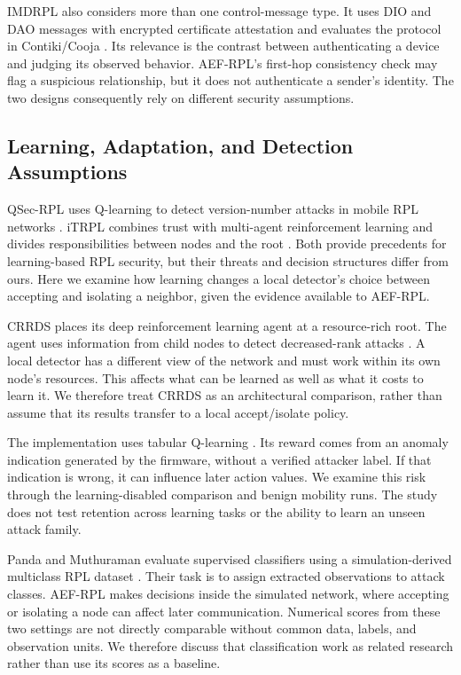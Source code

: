 \documentclass[journal]{IEEEtran}
\begin{document}
IMDRPL also considers more than one control-message type. It uses DIO and DAO messages with encrypted certificate attestation and evaluates the protocol in Contiki/Cooja \cite{imdrpl2023}. Its relevance is the contrast between authenticating a device and judging its observed behavior. AEF-RPL's first-hop consistency check may flag a suspicious relationship, but it does not authenticate a sender's identity. The two designs consequently rely on different security assumptions.

\subsection{Learning, Adaptation, and Detection Assumptions}
QSec-RPL uses Q-learning to detect version-number attacks in mobile RPL networks \cite{qsecrpl2023}. iTRPL combines trust with multi-agent reinforcement learning and divides responsibilities between nodes and the root \cite{itrpl2024}. Both provide precedents for learning-based RPL security, but their threats and decision structures differ from ours. Here we examine how learning changes a local detector's choice between accepting and isolating a neighbor, given the evidence available to AEF-RPL.

CRRDS places its deep reinforcement learning agent at a resource-rich root. The agent uses information from child nodes to detect decreased-rank attacks \cite{haqdad2026}. A local detector has a different view of the network and must work within its own node's resources. This affects what can be learned as well as what it costs to learn it. We therefore treat CRRDS as an architectural comparison, rather than assume that its results transfer to a local accept/isolate policy.

The implementation uses tabular Q-learning \cite{watkins1992}. Its reward comes from an anomaly indication generated by the firmware, without a verified attacker label. If that indication is wrong, it can influence later action values. We examine this risk through the learning-disabled comparison and benign mobility runs. The study does not test retention across learning tasks or the ability to learn an unseen attack family.

Panda and Muthuraman evaluate supervised classifiers using a simulation-derived multiclass RPL dataset \cite{panda2026}. Their task is to assign extracted observations to attack classes. AEF-RPL makes decisions inside the simulated network, where accepting or isolating a node can affect later communication. Numerical scores from these two settings are not directly comparable without common data, labels, and observation units. We therefore discuss that classification work as related research rather than use its scores as a baseline.
\end{document}
